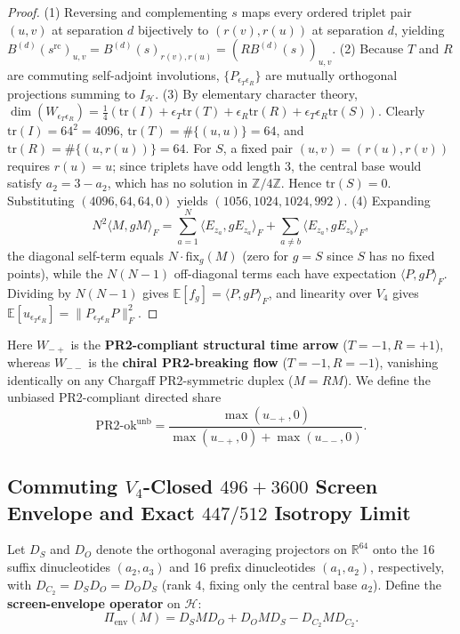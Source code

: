\documentclass[11pt,a4paper]{article}
\renewcommand{\_}{\origunderscore\penalty200\relax}
\theoremstyle{remark}
\begin{document}
\begin{proof}
(1) Reversing and complementing $s$ maps every ordered triplet pair $(u,v)$ at separation $d$ bijectively to $(r(v), r(u))$ at separation $d$, yielding $B^{(d)}(s^{\mathrm{rc}})_{u,v} = B^{(d)}(s)_{r(v),r(u)} = (RB^{(d)}(s))_{u,v}$.
(2) Because $T$ and $R$ are commuting self-adjoint involutions, $\{P_{\epsilon_T\epsilon_R}\}$ are mutually orthogonal projections summing to $I_{\mathcal{H}}$.
(3) By elementary character theory, $\dim(W_{\epsilon_T\epsilon_R}) = \frac{1}{4}(\mathrm{tr}(I) + \epsilon_T\mathrm{tr}(T) + \epsilon_R\mathrm{tr}(R) + \epsilon_T\epsilon_R\mathrm{tr}(S))$.
Clearly $\mathrm{tr}(I) = 64^2 = 4096$, $\mathrm{tr}(T) = \#\{(u,u)\} = 64$, and $\mathrm{tr}(R) = \#\{(u, r(u))\} = 64$.
For $S$, a fixed pair $(u,v) = (r(u), r(v))$ requires $r(u) = u$; since triplets have odd length $3$, the central base would satisfy $a_2 = 3 - a_2$, which has no solution in $\mathbb{Z}/4\mathbb{Z}$. Hence $\mathrm{tr}(S) = 0$.
Substituting $(4096, 64, 64, 0)$ yields $(1056, 1024, 1024, 992)$.
(4) Expanding
\[
N^2 \langle M, gM\rangle_F = \sum_{a=1}^N \langle E_{z_a}, g E_{z_a}\rangle_F + \sum_{a \ne b} \langle E_{z_a}, g E_{z_b}\rangle_F,
\]
the diagonal self-term equals $N\cdot \mathrm{fix}_g(M)$ (zero for $g=S$ since $S$ has no fixed points), while the $N(N-1)$ off-diagonal terms each have expectation $\langle P, gP\rangle_F$. Dividing by $N(N-1)$ gives $\mathbb{E}[f_g] = \langle P, gP\rangle_F$, and linearity over $V_4$ gives $\mathbb{E}[u_{\epsilon_T\epsilon_R}] = \|P_{\epsilon_T\epsilon_R}P\|_F^2$.
\end{proof}

Here $W_{-+}$ is the \textbf{PR2-compliant structural time arrow} ($T=-1, R=+1$), whereas $W_{--}$ is the \textbf{chiral PR2-breaking flow} ($T=-1, R=-1$), vanishing identically on any Chargaff PR2-symmetric duplex ($M = RM$).
We define the unbiased PR2-compliant directed share
\begin{equation}
\mathrm{PR2\text{-}ok}^{\mathrm{unb}} = \frac{\max(u_{-+}, 0)}{\max(u_{-+}, 0) + \max(u_{--}, 0)}.
\end{equation}

\subsection{Commuting \texorpdfstring{$V_4$}{V4}-Closed \texorpdfstring{$496 + 3600$}{496 + 3600} Screen Envelope and Exact \texorpdfstring{$447/512$}{447/512} Isotropy Limit}
Let $D_S$ and $D_O$ denote the orthogonal averaging projectors on $\mathbb{R}^{64}$ onto the 16 suffix dinucleotides $(a_2,a_3)$ and 16 prefix dinucleotides $(a_1,a_2)$, respectively, with $D_{C_2} = D_S D_O = D_O D_S$ (rank $4$, fixing only the central base $a_2$).
Define the \textbf{screen-envelope operator} on $\mathcal{H}$:
\begin{equation}
\Pi_{\mathrm{env}}(M) = D_S M D_O + D_O M D_S - D_{C_2} M D_{C_2}.
\end{equation}
\end{document}
